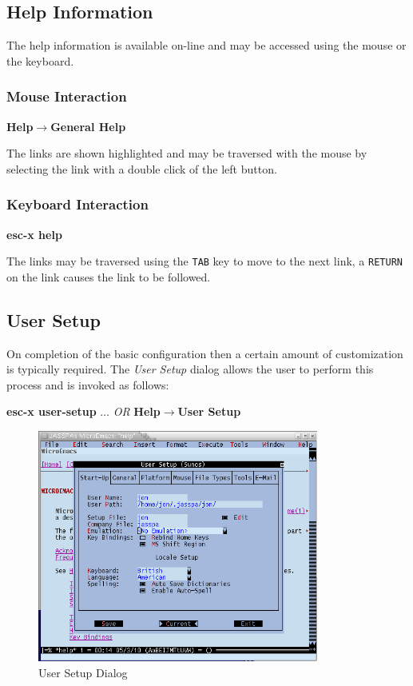 \documentclass[11pt,a4paper,pdftex]{article}
\begin{document}
\subsection{Help Information}

  The help information is available on-line and may be accessed using the
  mouse or the keyboard.

\subsubsection{Mouse Interaction}

  \textbf{Help$\rightarrow$General Help}

  The links are shown highlighted and may be traversed with the mouse by
  selecting the link with a double click of the left button.

\subsubsection{Keyboard Interaction}

  \textbf{esc-x help}

  The links may be traversed using the \texttt{TAB} key to move to the next
  link, a \texttt{RETURN} on the link causes the link to be followed.

\subsection{User Setup}

  On completion of the basic configuration then a certain amount of
  customization is typically required. The \textit{User Setup} dialog allows
  the user to perform this process and is invoked as follows:

  \textbf{esc-x user-setup} $\dots$ \textit{OR}\newline
  \textbf{Help$\rightarrow$User Setup}

\begin{figure}[!hbt]
  \begin{center}
    \includegraphics[keepaspectratio,height=3in]{usersetup}
    \caption{User Setup Dialog}
    \label{fig:usersetup}
  \end{center}
\end{figure}
\end{document}
